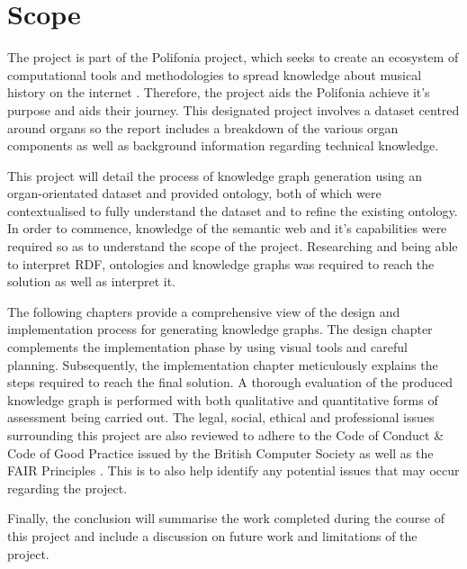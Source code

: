 \section{Scope}
The project is part of the Polifonia project, which seeks to create an ecosystem of computational tools and methodologies to spread knowledge about musical history on the internet \cite{polifoniaproject}. Therefore, the project aids the Polifonia achieve it's purpose and aids their journey. This designated project involves a dataset centred around organs so the report includes a breakdown of the various organ components as well as background information regarding technical knowledge.

This project will detail the process of knowledge graph generation using an organ-orientated dataset and provided ontology, both of which were contextualised to fully understand the dataset and to refine the existing ontology. In order to commence, knowledge of the semantic web and it's capabilities were required so as to understand the scope of the project. Researching and being able to interpret RDF, ontologies and knowledge graphs was required to reach the solution as well as interpret it. 

The following chapters provide a comprehensive view of the design and implementation process for generating knowledge graphs. The design chapter complements the implementation phase by using visual tools and careful planning. Subsequently, the implementation chapter meticulously explains the steps required to reach the final solution. A thorough evaluation of the produced knowledge graph is performed with both qualitative and quantitative forms of assessment being carried out. The legal, social, ethical and professional issues surrounding this project are also reviewed to adhere to the Code of Conduct \& Code of Good Practice issued by the British Computer Society \cite{bcs} as well as the FAIR Principles \cite{fairprinciples}. This is to also help identify any potential issues that may occur regarding the project. 

Finally, the conclusion will summarise the work completed during the course of this project and include a discussion on future work and limitations of the project. 

